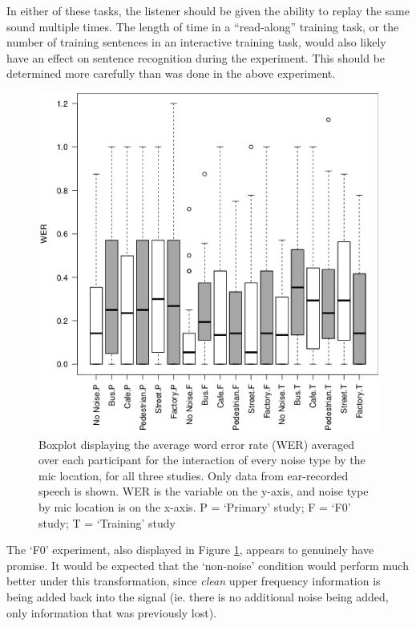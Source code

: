 \documentclass[dissertation,copyright]{uathesis}
\makeatletter
\def\maxwidth{ %
  \ifdim\Gin@nat@width>\linewidth
    \linewidth
  \else
    \Gin@nat@width
  \fi
}
\makeatother
\begin{document}
In either of these tasks, the listener should be given the ability to replay the same sound multiple times.  The length of time in a ``read-along'' training task, or the number of training sentences in an interactive training task, would also likely have an effect on sentence recognition during the experiment.  This should be determined more carefully than was done in the above experiment.

\begin{figure}[h!]

\includegraphics[width=\maxwidth]{figure/boxplot_noiseXmicXall_ear-1} 

\caption{Boxplot displaying the average word error rate (WER) averaged over each participant for the interaction of every noise type by the mic location, for all three studies. Only data from ear-recorded speech is shown.  WER is the variable on the y-axis, and noise type by mic location is on the x-axis. P = `Primary' study; F = `F0' study; T = `Training' study}
\label{fig:ALLXperc_noiseXmic_ear_boxplot}
\end{figure}

The `F0' experiment, also displayed in Figure \ref{fig:ALLXperc_noiseXmic_ear_boxplot}, appears to genuinely have promise.  It would be expected that the `non-noise' condition would perform much better under this transformation, since \textit{clean} upper frequency information is being added back into the signal (ie. there is no additional noise being added, only information that was previously lost).  
\end{document}
